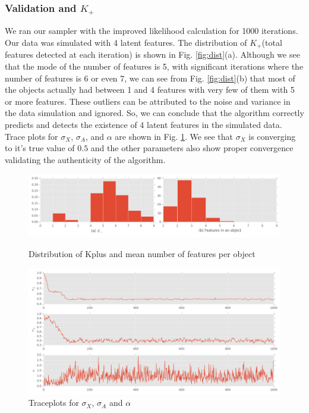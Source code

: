 \documentclass{article}
\begin{document}
\subsubsection{Validation and $K_+$}
We ran our sampler with the improved likelihood calculation for 1000 iterations. Our data was simulated with 4 latent features. The distribution of $K_+$(total features detected at each iteration) is shown in Fig. \ref{fig:dist}(a). Although we see that the mode of the number of features is 5, with significant iterations where the number of features is 6 or even 7, we can see from Fig. \ref{fig:dist}(b) that most of the objects actually had between 1 and 4 features with very few of them with 5 or more features. These outliers can be attributed to the noise and variance in the data simulation and ignored. So, we can conclude that the algorithm correctly predicts and detects the existence of 4 latent features in the simulated data.\\
Trace plots for $\sigma_X$, $\sigma_A$, and $\alpha$ are shown in Fig. \ref{fig:trace}. We see that $\sigma_X$ is converging to it's true value of $0.5$ and the other parameters also show proper convergence validating the authenticity of the algorithm.\\ 
\begin{figure}[ht]
\includegraphics[width=\linewidth]{figures/kDistribution.png}
\caption {Distribution of Kplus and mean number of features per object}
\label{fig:dist}
\includegraphics[width=\linewidth]{figures/Trace.png}
\caption {Traceplots for $\sigma_X$, $\sigma_A$ and $\alpha$}
\label{fig:trace}
\end{figure}
\end{document}
